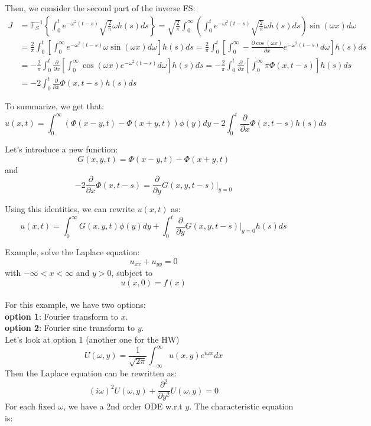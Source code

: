 \documentclass[12pt]{article} %
\begin{document}
Then, we consider the second part of the inverse FS:
\begin{align*}
J &= \mathbb{F}_{S}^{-1} \left\{ \int_{0}^{t} e^{-\omega^2 (t-s)} \sqrt{\frac{2}{\pi}} \omega h(s)ds \right\} = \sqrt{\frac{2}{\pi}} \int_{0}^{\infty} \left( \int_{0}^{t} e^{-\omega^2 (t-s)} \sqrt{\frac{2}{\pi}} \omega h(s)ds \right) \sin(\omega x )d \omega \\
& = \frac{2}{\pi} \int_{0}^{t} \left[ \int_{0}^{\infty}e^{-\omega^2 (t-s)}\omega \sin(\omega x )d \omega  \right]h(s) ds = \frac{2}{\pi} \int_{0}^{t} \left[ \int_{0}^{\infty} -\frac{\partial  \cos(\omega x)}{\partial x} e^{-\omega^2 (t-s)}d \omega  \right]h(s) ds\\ 
& =- \frac{2}{\pi} \int_{0}^{t} \frac{\partial  }{\partial x}  \left[ \int_{0}^{\infty} \cos(\omega x)e^{-\omega^2 (t-s)}d \omega  \right]h(s) ds = - \frac{2}{\pi} \int_{0}^{t} \frac{\partial  }{\partial x}  \left[ \int_{0}^{\infty} \pi \Phi (x, t-s)  \right]h(s) ds \\
& = -2 \int_{0}^{t}  \frac{\partial  }{\partial x} \Phi (x, t-s) h(s) ds
\end{align*}\par
To summarize, we get that:
$$
u(x, t) = \int_{0}^{\infty} \left( \Phi (x-y, t) - \Phi(x+y, t) \right) \phi(y)dy-2 \int_{0}^{t}  \frac{\partial  }{\partial x} \Phi (x, t-s) h(s) ds
$$\par
Let's introduce a new function:
$$
G(x, y, t) = \Phi (x-y, t) - \Phi(x+y, t)
$$
and 
$$
 -2\frac{\partial  }{\partial x} \Phi (x, t-s) = \frac{\partial}{\partial y} G(x, y, t-s)|_{y = 0}
$$\par
Using this identities, we can rewrite $u(x, t)$ as:
$$
u(x, t) = \int_{0}^{\infty}G(x, y, t)\phi(y) dy + \int_{0}^{t}\frac{\partial}{\partial y} G(x, y, t-s)|_{y = 0} h(s)ds
$$\par
Example, solve the Laplace equation:
$$
u_{xx} + u_{yy} = 0
$$ with $-\infty < x < \infty$ and $y > 0$, subject to 
$$
u(x, 0) = f(x)
$$\\
For this example, we have two options:\\
\textbf{option 1}: Fourier transform to $x$.\\
\textbf{option 2}: Fourier sine transform to $y$.\\
Let's look at option 1 (another one for the HW)
$$
U(\omega, y) = \frac{1}{\sqrt{2 \pi}} \int_{-\infty}^{\infty} u(x, y) e^{i \omega x} dx
$$
Then the Laplace equation can be rewritten as:
$$
(i\omega)^{2} U(\omega, y) + \frac{\partial ^2}{\partial y^2} U(\omega, y) =0
$$
For each fixed $\omega$, we have a 2nd order ODE w.r.t $y$. The characteristic equation is:
\end{document}
